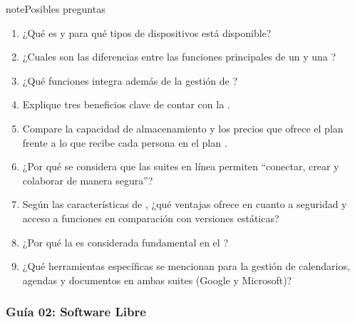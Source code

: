 \documentclass[letterpaper,10pt,spanish]{sphinxmanual}
\begin{document}
\begin{sphinxadmonition}{note}{Posibles preguntas}
\begin{enumerate}
\item {} 
\sphinxAtStartPar
¿Qué es  y para qué tipos de dispositivos está disponible?

\item {} 
\sphinxAtStartPar
¿Cuales son las diferencias entre las funciones principales de un  y una ?

\item {} 
\sphinxAtStartPar
¿Qué funciones integra  además de la gestión de ?

\item {} 
\sphinxAtStartPar
Explique tres beneficios clave de contar con la .

\item {} 
\sphinxAtStartPar
Compare la capacidad de almacenamiento y los precios que ofrece el plan  frente a lo que recibe cada persona en el plan .

\item {} 
\sphinxAtStartPar
¿Por qué se considera que las suites en línea permiten “conectar, crear y colaborar de manera segura”?

\item {} 
\sphinxAtStartPar
Según las características de , ¿qué ventajas ofrece en cuanto a seguridad y acceso a funciones en comparación con versiones estáticas?

\item {} 
\sphinxAtStartPar
¿Por qué la  es considerada fundamental en el ?

\item {} 
\sphinxAtStartPar
¿Qué herramientas específicas se mencionan para la gestión de calendarios, agendas y documentos en ambas suites (Google y Microsoft)?

\end{enumerate}
\end{sphinxadmonition}

\sphinxstepscope


\subsubsection{Guía 02: Software Libre}
\label{\detokenize{cursos/ofimatica10/periodo01/G02:guia-02-software-libre}}\label{\detokenize{cursos/ofimatica10/periodo01/G02::doc}}
\end{document}

